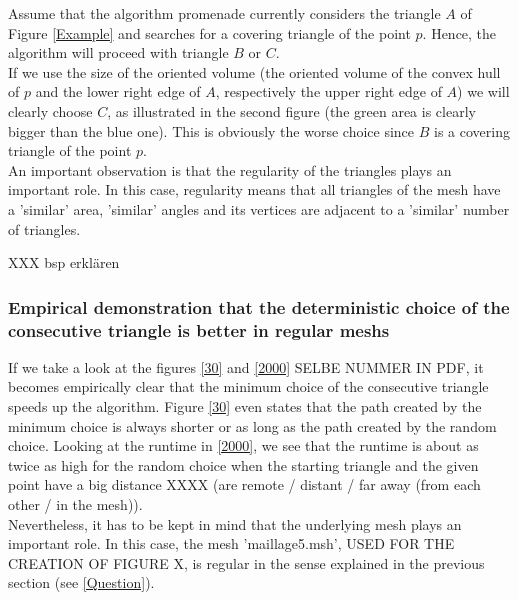 \documentclass[10pt]{article}
\begin{document}
	Assume that the algorithm {\ttfamily promenade} currently considers  the triangle $ A $ of Figure \ref{Example} and searches for a covering triangle of the point $ p $.
	Hence, the algorithm will proceed with triangle $ B $ or $ C $. \\
	 If we use the size of the oriented volume (the oriented volume of the convex hull of $ p $ and the lower right edge of $ A $, respectively the upper right edge of $ A $) we will clearly choose $ C $, as illustrated in the second figure (the green area is clearly bigger than the blue one). This is obviously the worse choice since $ B $ is a covering triangle of the point $ p $.  \\
	 An important observation is that the regularity of the triangles plays an important role. In this case, regularity means that all triangles of the mesh have a 'similar' area, 'similar' angles and its vertices are adjacent to a 'similar' number of triangles.
	 
	 XXX bsp erklären

\subsubsection{Empirical demonstration that the deterministic choice of the consecutive triangle is better in regular meshs}
If we take a look at the figures \ref{30} and \ref{2000} SELBE NUMMER IN PDF, it becomes empirically clear that the minimum choice of the consecutive triangle speeds up the algorithm. Figure \ref{30} even states that the path created by the minimum choice is always shorter or as long as the path created by the random choice. Looking at the runtime in \ref{2000}, we see that the runtime is about as twice as high for the random choice when the starting triangle and the given point have a big distance XXXX (are remote / distant / far away (from each other / in the mesh)). 
 \\
Nevertheless, it has to be kept in mind that the underlying mesh plays an important role.
In this case, the mesh 'maillage5.msh', USED FOR THE CREATION OF FIGURE X, is regular in the sense explained in the previous section (see \ref{Question}).  
\end{document}
